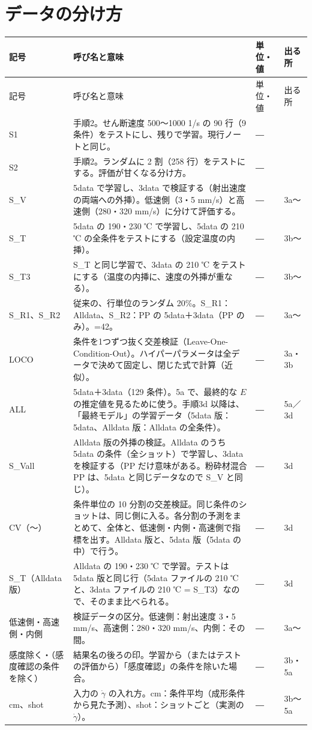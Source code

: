 \documentclass[paper=a4paper,fontsize=10.5pt,line_length=44zw,number_of_lines=38]{jlreq}
\makeatletter
\newcommand{\file}[1]{\texttt{\detokenize{#1}}}
\newcommand{\gd}{\dot{\gamma}}
\newenvironment{symtab}{%
  \begin{longtable}{@{}>{\raggedright\arraybackslash}p{6.5\zw}>{\raggedright\arraybackslash}p{22\zw}>{\raggedright\arraybackslash}p{6\zw}>{\raggedright\arraybackslash}p{4.5\zw}@{}}
  \toprule 記号 & 呼び名と意味 & 単位・値 & 出る所 \\ \midrule \endfirsthead
  \toprule 記号 & 呼び名と意味 & 単位・値 & 出る所 \\ \midrule \endhead
  \bottomrule \endlastfoot}{\end{longtable}}
\makeatother
\begin{document}
\section{データの分け方}

\begin{symtab}
S1 & 手順2。せん断速度 500〜1000 1/s の 90 行（9 条件）をテストにし、残りで学習。現行ノートと同じ。 & ― & 2 \\
S2 & 手順2。ランダムに 2 割（258 行）をテストにする。評価が甘くなる分け方。 & ― & 2 \\
S\_V & 5data で学習し、3data で検証する（射出速度の両端への外挿）。低速側（3・5 mm/s）と高速側（280・320 mm/s）に分けて評価する。 & ― & 3a〜 \\
S\_T & 5data の 190・230 ℃ で学習し、5data の 210 ℃ の全条件をテストにする（設定温度の内挿）。 & ― & 3b〜 \\
S\_T3 & S\_T と同じ学習で、3data の 210 ℃ をテストにする（温度の内挿に、速度の外挿が重なる）。 & ― & 3b〜 \\
S\_R1、S\_R2 & 従来の、行単位のランダム 20\%。S\_R1：Alldata、S\_R2：PP の 5data＋3data（PP のみ）。\file{random_state}=42。 & ― & 3a〜 \\
LOCO & 条件を1つずつ抜く交差検証（Leave-One-Condition-Out）。ハイパーパラメータは全データで決めて固定し、閉じた式で計算（近似）。 & ― & 3a・3b \\
ALL & 5data＋3data（129 条件）。5a で、最終的な $E$ の推定値を見るために使う。手順3d 以降は、「最終モデル」の学習データ（5data 版：5data、Alldata 版：Alldata の全条件）。 & ― & 5a／3d \\
S\_Vall & Alldata 版の外挿の検証。Alldata のうち 5data の条件（全ショット）で学習し、3data を検証する（PP だけ意味がある。粉砕材混合 PP は、5data と同じデータなので S\_V と同じ）。 & ― & 3d \\
CV（\file{CV1}〜\file{CV10}）& 条件単位の 10 分割の交差検証。同じ条件のショットは、同じ側に入る。各分割の予測をまとめて、全体と、低速側・内側・高速側で指標を出す。Alldata 版と、5data 版（5data の中）で行う。 & ― & 3d \\
S\_T（Alldata 版）& Alldata の 190・230 ℃ で学習。テストは 5data 版と同じ行（5data ファイルの 210 ℃ と、3data ファイルの 210 ℃ = S\_T3）なので、そのまま比べられる。 & ― & 3d \\
低速側・高速側・内側 & 検証データの区分。低速側：射出速度 3・5 mm/s、高速側：280・320 mm/s、内側：その間。 & ― & 3a〜 \\
感度除く・（感度確認の条件を除く） & 結果名の後ろの印。学習から（またはテストの評価から）「感度確認」の条件を除いた場合。 & ― & 3b・5a \\
cm、shot & 入力の $\gd$ の入れ方。cm：条件平均（成形条件から見た予測）、shot：ショットごと（実測の $\gd$）。 & ― & 3b〜5a \\
\end{symtab}
\end{document}
